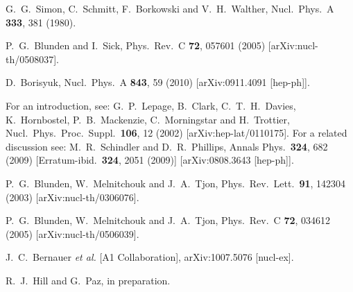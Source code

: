 \documentclass[12pt]{article}
\begin{document}
\begin{thebibliography}{99}
  G.~G.~Simon, C.~Schmitt, F.~Borkowski and V.~H.~Walther,
  Nucl.\ Phys.\  A {\bf 333}, 381 (1980).
  
  P.~G.~Blunden and I.~Sick,
  Phys.\ Rev.\  C {\bf 72}, 057601 (2005)
  [arXiv:nucl-th/0508037].

  D.~Borisyuk,
  Nucl.\ Phys.\  A {\bf 843}, 59 (2010)
  [arXiv:0911.4091 [hep-ph]].
  
  For an introduction, see:
  G.~P.~Lepage, B.~Clark, C.~T.~H.~Davies, K.~Hornbostel, P.~B.~Mackenzie, C.~Morningstar and H.~Trottier,
  Nucl.\ Phys.\ Proc.\ Suppl.\  {\bf 106}, 12 (2002)
  [arXiv:hep-lat/0110175].
  For a related discussion see:
  M.~R.~Schindler and D.~R.~Phillips,
  Annals Phys.\  {\bf 324}, 682 (2009)
  [Erratum-ibid.\  {\bf 324}, 2051 (2009)]
  [arXiv:0808.3643 [hep-ph]].


 
  P.~G.~Blunden, W.~Melnitchouk and J.~A.~Tjon,
  Phys.\ Rev.\ Lett.\  {\bf 91}, 142304 (2003)
  [arXiv:nucl-th/0306076].

  P.~G.~Blunden, W.~Melnitchouk and J.~A.~Tjon,
  Phys.\ Rev.\  C {\bf 72}, 034612 (2005)
  [arXiv:nucl-th/0506039].

  J.~C.~Bernauer {\it et al.}  [A1 Collaboration],
  arXiv:1007.5076 [nucl-ex].
  
R.~J.~Hill and G.~Paz, in preparation. 

\end{thebibliography}
\end{document}
